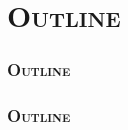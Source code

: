 

\section*{\textsc{Outline}}
\begin{frame}
\frametitle{\textsc{Outline}}
\end{frame}

\begin{frame}
\frametitle{\textsc{Outline}}
\tableofcontents[pausesections]
\end{frame}
